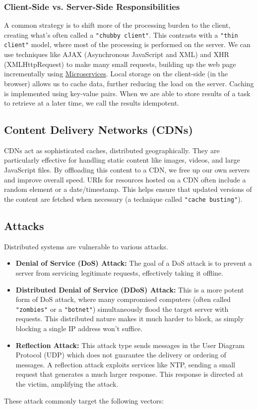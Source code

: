 \subsubsection{Client-Side vs. Server-Side Responsibilities}

A common strategy is to shift more of the processing burden to the client, creating what's often called a \texttt{"chubby client"}. This contrasts with a \texttt{"thin client"} model, where most of the processing is performed on the server. We can use techniques like AJAX (Asynchronous JavaScript and XML) and XHR (XMLHttpRequest) to make many small requests, building up the web page incrementally using \href{https://aws.amazon.com/microservices/}{Microservices}. Local storage on the client-side (in the browser) allows us to cache data, further reducing the load on the server. Caching is implemented using key-value pairs. When we are able to store results of a task to retrieve at a later time, we call the results idempotent.

\subsection{Content Delivery Networks (CDNs)}

CDNs act as sophisticated caches, distributed geographically. They are particularly effective for handling static content like images, videos, and large JavaScript files. By offloading this content to a CDN, we free up our own servers and improve overall speed. URIs for resources hosted on a CDN often include a random element or a date/timestamp. This helps ensure that updated versions of the content are fetched when necessary (a technique called \texttt{"cache busting"}).

\subsection{Attacks}
Distributed systems are vulnerable to various attacks.

\begin{itemize}
\item \textbf{Denial of Service (DoS) Attack:} The goal of a DoS attack is to prevent a server from servicing legitimate requests, effectively taking it offline.
\item \textbf{Distributed Denial of Service (DDoS) Attack:} This is a more potent form of DoS attack, where many compromised computers (often called \texttt{"zombies"} or a \texttt{"botnet"}) simultaneously flood the target server with requests. This distributed nature makes it much harder to block, as simply blocking a single IP address won't suffice.
\item \textbf{Reflection Attack:} This attack type sends messages in the User Diagram Protocol (UDP) which does not guarantee the delivery or ordering of messages. A reflection attack exploits services like NTP, sending a small request that generates a much larger response. This response is directed at the victim, amplifying the attack.
\end{itemize}
These attack commonly target the following vectors:

